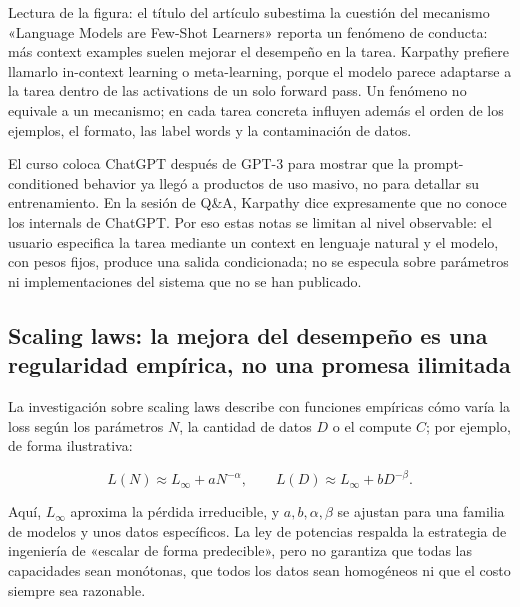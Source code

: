 \begin{knowledgebox}{Lectura de la figura: el título del artículo subestima la cuestión del mecanismo}
«Language Models are Few-Shot Learners» reporta un fenómeno de conducta: más context examples suelen mejorar el desempeño en la tarea. Karpathy prefiere llamarlo in-context learning o meta-learning, porque el modelo parece adaptarse a la tarea dentro de las activations de un solo forward pass. Un fenómeno no equivale a un mecanismo; en cada tarea concreta influyen además el orden de los ejemplos, el formato, las label words y la contaminación de datos.
\end{knowledgebox}


El curso coloca ChatGPT después de GPT-3 para mostrar que la prompt-conditioned behavior ya llegó a productos de uso masivo, no para detallar su entrenamiento. En la sesión de Q\&A, Karpathy dice expresamente que no conoce los internals de ChatGPT. Por eso estas notas se limitan al nivel observable: el usuario especifica la tarea mediante un context en lenguaje natural y el modelo, con pesos fijos, produce una salida condicionada; no se especula sobre parámetros ni implementaciones del sistema que no se han publicado.

\subsection{Scaling laws: la mejora del desempeño es una regularidad empírica, no una promesa ilimitada}

La investigación sobre scaling laws describe con funciones empíricas cómo varía la loss según los parámetros $N$, la cantidad de datos $D$ o el compute $C$; por ejemplo, de forma ilustrativa:

\[
L(N)\approx L_\infty+aN^{-\alpha},\qquad
L(D)\approx L_\infty+bD^{-\beta}.
\]

Aquí, $L_\infty$ aproxima la pérdida irreducible, y $a,b,\alpha,\beta$ se ajustan para una familia de modelos y unos datos específicos. La ley de potencias respalda la estrategia de ingeniería de «escalar de forma predecible», pero no garantiza que todas las capacidades sean monótonas, que todos los datos sean homogéneos ni que el costo siempre sea razonable.



